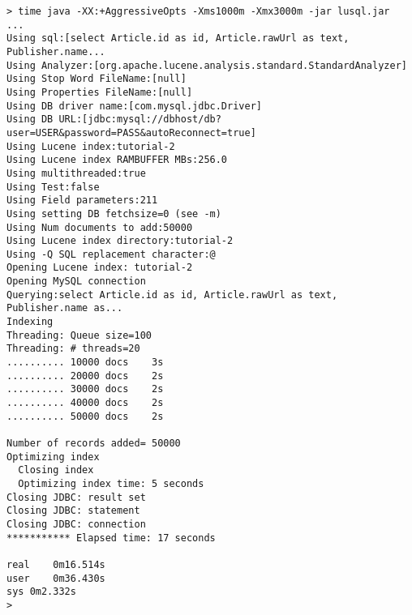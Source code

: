 
{\small
\begin{lstlisting}[backgroundcolor=\color{grey}]
> time java -XX:+AggressiveOpts -Xms1000m -Xmx3000m -jar lusql.jar  ...
Using sql:[select Article.id as id, Article.rawUrl as text, Publisher.name... 
Using Analyzer:[org.apache.lucene.analysis.standard.StandardAnalyzer]
Using Stop Word FileName:[null]
Using Properties FileName:[null]
Using DB driver name:[com.mysql.jdbc.Driver]
Using DB URL:[jdbc:mysql://dbhost/db?user=USER&password=PASS&autoReconnect=true]
Using Lucene index:tutorial-2
Using Lucene index RAMBUFFER MBs:256.0
Using multithreaded:true
Using Test:false
Using Field parameters:211
Using setting DB fetchsize=0 (see -m)
Using Num documents to add:50000
Using Lucene index directory:tutorial-2
Using -Q SQL replacement character:@
Opening Lucene index: tutorial-2
Opening MySQL connection
Querying:select Article.id as id, Article.rawUrl as text, Publisher.name as...
Indexing
Threading: Queue size=100
Threading: # threads=20
.......... 10000 docs    3s
.......... 20000 docs    2s
.......... 30000 docs    2s
.......... 40000 docs    2s
.......... 50000 docs    2s

Number of records added= 50000
Optimizing index
  Closing index
  Optimizing index time: 5 seconds
Closing JDBC: result set
Closing JDBC: statement
Closing JDBC: connection
*********** Elapsed time: 17 seconds

real	0m16.514s
user	0m36.430s
sys	0m2.332s
>
\end{lstlisting}
}